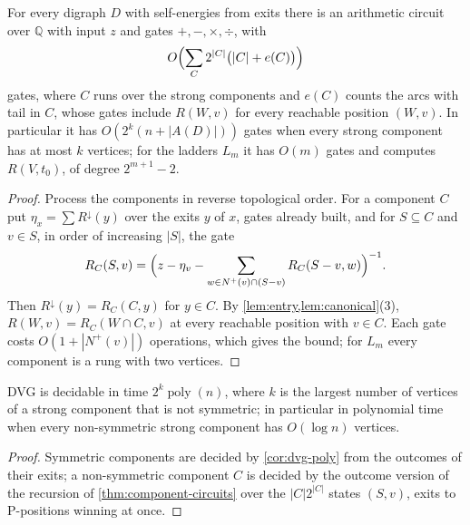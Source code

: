 \documentclass[final]{siamart0516}
\numberwithin{theorem}{section}
\numberwithin{equation}{section}
\theoremstyle{siamnonum}
\theoremstyle{plain}
\newcommand{\QQ}{\mathbb{Q}}
\newcommand{\poly}{\operatorname{poly}}
\newcommand{\Rdown}{R^{\downarrow}}
\newcommand{\nplus}{N^{+}}
\begin{document}
\begin{theorem}\label{thm:component-circuits}
For every digraph $D$ with self-energies from exits there is an arithmetic circuit over $\QQ$ with input $z$ and gates $+,-,\times,\div$, with
\[
O\Bigl(\sum_{C}2^{|C|}\bigl(|C|+e(C)\bigr)\Bigr)
\]
gates, where $C$ runs over the strong components and $e(C)$ counts the arcs with tail in $C$, whose gates include $R(W,v)$ for every reachable position $(W,v)$. In particular it has $O(2^{k}(n+|A(D)|))$ gates when every strong component has at most $k$ vertices; for the ladders $L_m$ it has $O(m)$ gates and computes $R(V,t_0)$, of degree $2^{m+1}-2$.
\end{theorem}
\begin{proof}
Process the components in reverse topological order. For a component $C$ put $\eta_x=\sum\Rdown(y)$ over the exits $y$ of $x$, gates already built, and for $S\subseteq C$ and $v\in S$, in order of increasing $|S|$, the gate
\[
R_C(S,v)=\Bigl(z-\eta_v-\sum_{w\in\nplus(v)\cap(S-v)}R_C(S-v,w)\Bigr)^{-1}.
\]
Then $\Rdown(y)=R_C(C,y)$ for $y\in C$. By \cref{lem:entry,lem:canonical}(3), $R(W,v)=R_C(W\cap C,v)$ at every reachable position with $v\in C$. Each gate costs $O(1+|\nplus(v)|)$ operations, which gives the bound; for $L_m$ every component is a rung with two vertices.
\end{proof}

\begin{corollary}\label{cor:small-components}
DVG is decidable in time $2^{k}\poly(n)$, where $k$ is the largest number of vertices of a strong component that is not symmetric; in particular in polynomial time when every non-symmetric strong component has $O(\log n)$ vertices.
\end{corollary}
\begin{proof}
Symmetric components are decided by \cref{cor:dvg-poly} from the outcomes of their exits; a non-symmetric component $C$ is decided by the outcome version of the recursion of \cref{thm:component-circuits} over the $|C|2^{|C|}$ states $(S,v)$, exits to P-positions winning at once.
\end{proof}
\end{document}
